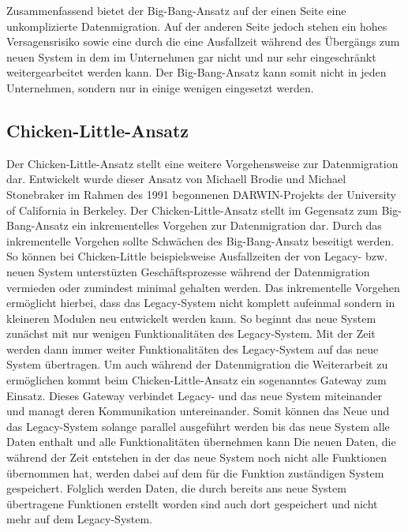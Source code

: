 \lb
Zusammenfassend bietet der Big-Bang-Ansatz auf der einen Seite eine unkomplizierte Datenmigration. Auf der anderen Seite jedoch stehen ein hohes Versagensrisiko sowie eine durch die eine Ausfallzeit während des Übergängs zum neuen System in dem im Unternehmen gar nicht und nur sehr eingeschränkt weitergearbeitet werden kann. Der Big-Bang-Ansatz kann somit nicht in jeden Unternehmen, sondern nur in einige wenigen eingesetzt werden. 

\subsection{Chicken-Little-Ansatz}


Der Chicken-Little-Ansatz stellt eine weitere Vorgehensweise zur Datenmigration dar. Entwickelt wurde dieser Ansatz von Michaell Brodie und Michael Stonebraker im Rahmen des 1991 begonnenen DARWIN-Projekts der University of California in Berkeley.\citep{zoulafy-2002} Der Chicken-Little-Ansatz stellt im Gegensatz zum Big-Bang-Ansatz ein inkrementelles Vorgehen zur Datenmigration dar. Durch das inkrementelle Vorgehen sollte Schwächen des Big-Bang-Ansatz beseitigt werden. So können bei Chicken-Little beispielsweise Ausfallzeiten der von Legacy- bzw. neuen System unterstüzten Geschäftsprozesse während der Datenmigration vermieden oder zumindest minimal gehalten werden.\citep{zoulafy-2002}
\lb
Das inkrementelle Vorgehen ermöglicht hierbei, dass das Legacy-System nicht komplett aufeinmal sondern in kleineren Modulen neu entwickelt werden kann. So beginnt das neue System zunächst mit nur wenigen Funktionalitäten des Legacy-System. Mit der Zeit werden dann immer weiter Funktionalitäten des Legacy-System auf das neue System übertragen.\citep[S. 2]{wuLawless-1997} 
\lb
Um auch während der Datenmigration die Weiterarbeit zu ermöglichen kommt beim Chicken-Little-Ansatz ein sogenanntes Gateway zum Einsatz. Dieses Gateway verbindet Legacy- und das neue System miteinander und managt deren Kommunikation untereinander. Somit können das Neue und das Legacy-System solange parallel ausgeführt werden bis das neue System alle Daten enthalt und alle Funktionalitäten übernehmen kann\citep[S. 2]{wuLawless-1997} Die neuen Daten, die während der Zeit entstehen in der das neue System noch nicht alle Funktionen übernommen hat, werden dabei auf dem für die Funktion zuständigen System gespeichert. Folglich werden Daten, die durch bereits ans neue System übertragene Funktionen erstellt worden sind auch dort gespeichert und nicht mehr auf dem Legacy-System.\citep[S. 2]{wuLawless-1997} 
